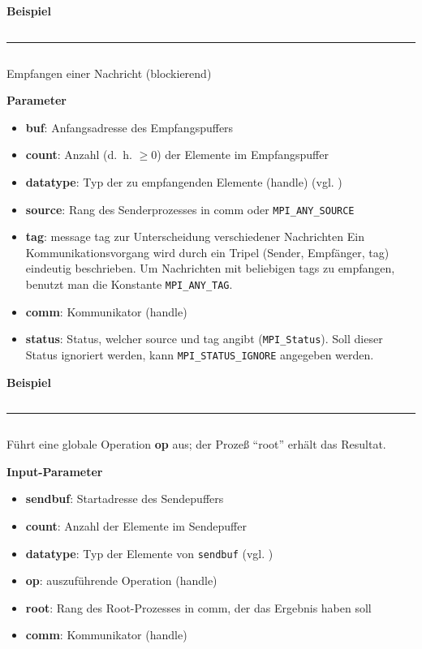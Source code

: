 \textbf{Beispiel}
\inputminted[numbersep=5pt, tabsize=4]{c}{scripts/mpi/mpi-send-example.c}
\goodbreak
\rule{\textwidth}{0.4pt}%
\inputminted[numbersep=5pt, tabsize=4]{c}{scripts/mpi/mpi-receive.c}
Empfangen einer Nachricht (blockierend)

\textbf{Parameter}
\begin{itemize}
    \item \textbf{buf}: Anfangsadresse des Empfangspuffers
    \item \textbf{count}: Anzahl (d.~h. $\geq 0$) der Elemente im Empfangspuffer
    \item \textbf{datatype}: Typ der zu empfangenden Elemente (handle) (vgl. )
    \item \textbf{source}: Rang des Senderprozesses in comm oder \texttt{MPI\_ANY\_SOURCE}
    \item \textbf{tag}: message tag zur Unterscheidung verschiedener Nachrichten
                  Ein Kommunikationsvorgang wird durch ein Tripel (Sender, Empfänger, tag) eindeutig beschrieben. Um Nachrichten mit beliebigen tags zu empfangen, benutzt man die Konstante \texttt{MPI\_ANY\_TAG}.
    \item \textbf{comm}: Kommunikator (handle)
    \item \textbf{status}: Status, welcher source und tag angibt (\texttt{MPI\_Status}).
          Soll dieser Status ignoriert werden, kann \texttt{MPI\_STATUS\_IGNORE} angegeben werden.
\end{itemize}

\textbf{Beispiel}
\inputminted[numbersep=5pt, tabsize=4]{c}{scripts/mpi/mpi-receive-example.c}
\goodbreak
\rule{\textwidth}{0.4pt}%
\inputminted[numbersep=5pt, tabsize=4]{c}{scripts/mpi/mpi-reduce.c}
Führt eine globale Operation \textbf{op} aus; der Prozeß \enquote{root} erhält das Resultat.

\textbf{Input-Parameter}
\begin{itemize}
    \item \textbf{sendbuf}: Startadresse des Sendepuffers
    \item \textbf{count}: Anzahl der Elemente im Sendepuffer
    \item \textbf{datatype}: Typ der Elemente von \texttt{sendbuf} (vgl. )
    \item \textbf{op}: auszuführende Operation (handle)
    \item \textbf{root}: Rang des Root-Prozesses in comm, der das Ergebnis haben soll
    \item \textbf{comm}: Kommunikator (handle)
\end{itemize}

